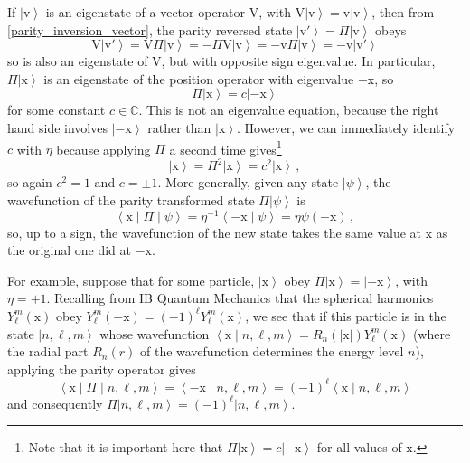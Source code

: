 \documentclass{article}
\theoremstyle{plain}\theoremheaderfont{\normalfont\itshape}\theorembodyfont{\rmfamily}\theoremseparator{.}\newtheorem*{rem}{Remark}\newtheorem*{ex}{Example}\newtheorem*{proof}{Proof}\newtheorem*{altp}{Alternative proof}
\theoremstyle{plain}\theoremheaderfont{\normalfont\bfseries}\theorembodyfont{\rmfamily}\theoremseparator{.}\newtheorem{thm}{Theorem}[section]\newtheorem{lem}[thm]{Lemma}\newtheorem{prop}[thm]{Proposition}\newtheorem*{cor}{Corollary}\newtheorem{defn}[thm]{Definition}\newtheorem{clm}[thm]{Claim}\newtheorem{clminproof}{Claim}
\theoremstyle{break}\theoremheaderfont{\normalfont\itshape}\theorembodyfont{\rmfamily}\theoremseparator{.\medskip}\newtheorem*{proofskip}{Proof}\newtheorem*{exs}{Examples}\newtheorem*{rems}{Remarks}
\theoremstyle{break}\theoremheaderfont{\normalfont\bfseries}\theorembodyfont{\rmfamily}\theoremseparator{.\medskip}\newtheorem{lemskip}[thm]{Lemma}\newtheorem{defnskip}[thm]{Definition}\newtheorem{propskip}[thm]{Proposition}\newtheorem{thmskip}[thm]{Theorem}
\numberwithin{equation}{section}
\newcommand{\ket}[1]{\left| #1 \right\rangle}
\newcommand{\braket}[2]{\left\langle #1 \middle| #2 \right\rangle}
\newcommand{\mel}[3]{\left\langle #1 \middle| #2 \middle| #3 \right\rangle}
\newcommand{\vb}[1]{\bm{\mathrm{#1}}}
\newcommand{\abs}[1]{\left| #1 \right|}
\newcommand{\CC}{\mathbb{C}}
\begin{document}
    If \(\ket{\vb{v}}\) is an eigenstate of a vector operator \(\vb{V}\), with \(\vb{V}\ket{\vb{v}}=\vb{v}\ket{\vb{v}}\), then from \ref{parity_inversion_vector}, the parity reversed state \(\ket{\vb{v}'}=\Pi\ket{\vb{v}}\) obeys
    \begin{equation}
        \vb{V}\ket{\vb{v}'}=\vb{V}\Pi\ket{\vb{v}}=-\Pi\vb{V}\ket{\vb{v}}=-\vb{v}\Pi\ket{\vb{v}}=-\vb{v}\ket{\vb{v}'}
    \end{equation}
    so is also an eigenstate of \(\vb{V}\), but with opposite sign eigenvalue. In particular, \(\Pi\ket{\vb{x}}\) is an eigenstate of the position operator with eigenvalue \(-\vb{x}\), so
    \begin{equation}
        \Pi\ket{\vb{x}}=c\ket{-\vb{x}}
    \end{equation}
    for some constant \(c\in\CC\). This is not an eigenvalue equation, because the right hand side involves \(\ket{-\vb{x}}\) rather than \(\ket{\vb{x}}\). However, we can immediately identify \(c\) with \(\eta\) because applying \(\Pi\) a second time gives\footnote{Note that it is important here that \(\Pi\ket{\vb{x}}=c\ket{-\vb{x}}\) for all values of \(\vb{x}\).}
    \begin{equation}
        \ket{\vb{x}}=\Pi^2\ket{\vb{x}}=c^2\ket{\vb{x}}\,,
    \end{equation}
    so again \(c^2=1\) and \(c=\pm 1\). More generally, given any state \(\ket{\psi}\), the wavefunction of the parity transformed state \(\Pi\ket{\psi}\) is
    \begin{equation}
        \mel{\vb{x}}{\Pi}{\psi}=\eta^{-1}\braket{-\vb{x}}{\psi}=\eta\psi(-\vb{x})\,,
    \end{equation}
    so, up to a sign, the wavefunction of the new state takes the same value at \(\vb{x}\) as the original one did at \(-\vb{x}\).

    For example, suppose that for some particle, \(\ket{\vb{x}}\) obey \(\Pi\ket{\vb{x}}=\ket{-\vb{x}}\), with \(\eta=+1\). Recalling from IB Quantum Mechanics that the spherical harmonics \(Y_\ell^m(\vb{x})\) obey \(Y_\ell^m(-\vb{x})=(-1)^\ell Y_\ell^m(\vb{x})\), we see that if this particle is in the state \(\ket{n,\ell,m}\) whose wavefunction \(\braket{\vb{x}}{n,\ell,m}=R_n(\abs{\vb{x}})Y_\ell^m(\vb{x})\) (where the radial part \(R_n(r)\) of the wavefunction determines the energy level \(n\)), applying the parity operator gives
    \begin{equation}\label{spherical_harmonics_parity}
        \mel{\vb{x}}{\Pi}{n,\ell,m}=\braket{-\vb{x}}{n,\ell,m}=(-1)^\ell\braket{\vb{x}}{n,\ell,m}
    \end{equation}
    and consequently \(\Pi\ket{n,\ell,m}=(-1)^\ell\ket{n,\ell,m}\).
\end{document}
